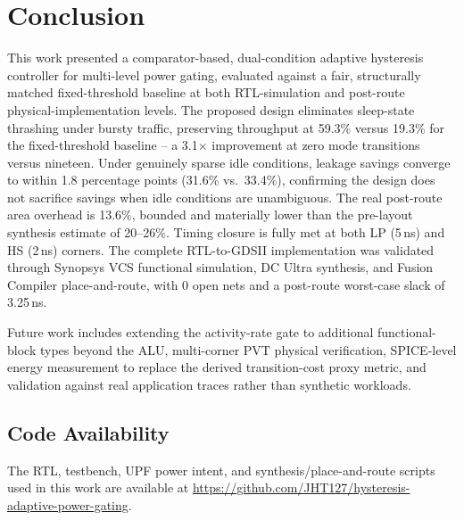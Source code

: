 \section{Conclusion}
\label{sec:conclusion}

This work presented a comparator-based, dual-condition adaptive hysteresis controller for multi-level power gating, evaluated against a fair, structurally matched fixed-threshold baseline at both RTL-simulation and post-route physical-implementation levels. The proposed design eliminates sleep-state thrashing under bursty traffic, preserving throughput at 59.3\% versus 19.3\% for the fixed-threshold baseline -- a 3.1$\times$ improvement at zero mode transitions versus nineteen. Under genuinely sparse idle conditions, leakage savings converge to within 1.8 percentage points (31.6\% vs.\ 33.4\%), confirming the design does not sacrifice savings when idle conditions are unambiguous. The real post-route area overhead is 13.6\%, bounded and materially lower than the pre-layout synthesis estimate of 20--26\%. Timing closure is fully met at both LP (5\,ns) and HS (2\,ns) corners. The complete RTL-to-GDSII implementation was validated through Synopsys VCS functional simulation, DC Ultra synthesis, and Fusion Compiler place-and-route, with 0 open nets and a post-route worst-case slack of 3.25\,ns.

Future work includes extending the activity-rate gate to additional functional-block types beyond the ALU, multi-corner PVT physical verification, SPICE-level energy measurement to replace the derived transition-cost proxy metric, and validation against real application traces rather than synthetic workloads.

\subsection*{Code Availability}
The RTL, testbench, UPF power intent, and synthesis/place-and-route scripts used in this work are available at \url{https://github.com/JHT127/hysteresis-adaptive-power-gating}.
